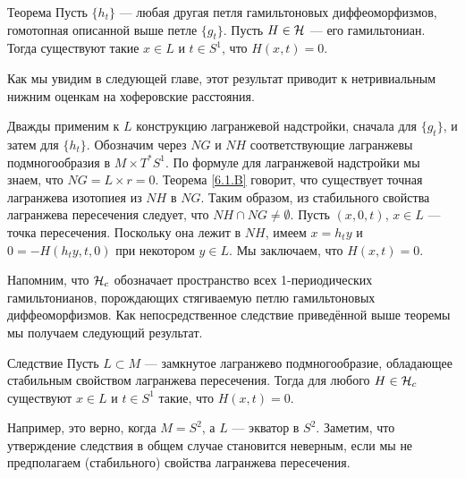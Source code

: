 \begin{thm}{Теорема}\label{6.3.A}
Пусть $\{h_t\}$ --- любая другая петля гамильтоновых диффеоморфизмов, гомотопная описанной выше петле $\{g_t\}$.
Пусть $H \in \mathcal{H}$ --- его гамильтониан.
Тогда существуют такие $x \in L$ и $t \in S^1$, что $H (x, t) = 0$.
\end{thm}

Как мы увидим в следующей главе, этот результат приводит к нетривиальным нижним оценкам на хоферовские расстояния.

Дважды применим к $L$ конструкцию лагранжевой надстройки, сначала для $\{g_t\}$, и затем для $\{h_t\}$.
Обозначим через $NG$ и $NH$ соответствующие лагранжевы подмногообразия в $M \times T^\ast S^1$.
По формуле для лагранжевой надстройки мы знаем, что $NG = L \times {r = 0}$.
Теорема \ref{6.1.B} говорит, что существует точная лагранжева изотопиея из $NH$ в $NG$.
Таким образом, из стабильного свойства лагранжева пересечения следует, что $NH \cap NG \ne \emptyset$.
Пусть $(x, 0, t)$, $x \in L$ --- точка пересечения.
Поскольку она лежит в $NH$, имеем $x = h_t y$ и $0 = -H (h_t y, t, 0)$ при некотором $y \in L$.
Мы заключаем, что $H (x, t) = 0$.
\qeds

Напомним, что $\mathcal{H}_c$ обозначает пространство всех 1-периодических гамильтонианов, порождающих стягиваемую петлю гамильтоновых диффеоморфизмов.
Как непосредственное следствие приведённой выше теоремы мы получаем следующий результат.

\begin{thm}{Следствие}\label{6.3.B}
Пусть $L \subset M$ --- замкнутое лагранжево подмногообразие, обладающее стабильным свойством лагранжева пересечения.
Тогда для любого $H \in \mathcal{H}_c$ существуют $x \in L$ и $t \in S^1$ такие, что $H (x, t) = 0$.
\end{thm}


Например, это верно, когда $M = S^2$, а $L$ --- экватор в $S^2$.
Заметим, что утверждение следствия в общем случае становится неверным, если мы не предполагаем (стабильного) свойства лагранжева пересечения.

